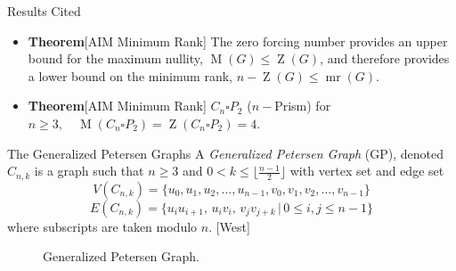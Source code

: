 \documentclass[final]{beamer}
\def\red{\color{red}}
\newcommand{\mr}{\operatorname{mr}}
\newcommand{\M}{\operatorname{M}}
\newcommand{\Z}{\operatorname{Z}}
\newcommand{\bit}{\begin{itemize}}
\newcommand{\eit}{\end{itemize}}
\begin{document}
\begin{frame}{}
\begin{columns}[t]
\begin{column}{0.38\linewidth}
\begin{block}{Results Cited}
\bit

\item {\bf Theorem}[AIM Minimum Rank]
The zero forcing number provides an upper bound for the maximum nullity, $\M(G) \leq \Z(G)$, and therefore provides a lower bound on the minimum rank, $n-\Z(G) \leq \mr(G)$. 
\item {\bf Theorem}[AIM Minimum Rank]
$C_n \square P_2$ ($n-$Prism) for $n \geq 3, \quad\M(C_n \square P_2) = \Z(C_n \square P_2) = 4.$
\eit
\end{block}

\begin{block}{\red\Huge The Generalized Petersen Graphs}
A {\color{blue}\emph{Generalized Petersen Graph}} (GP), denoted $C_{n,k}$
is a graph such that 
$n \geq 3$ and $0 < k \leq \lfloor \frac{n-1}{2} \rfloor$
with vertex set and edge set
\[
V(C_{n,k}) = \{u_0, u_1, u_2, \ldots, u_{n-1}, v_0, v_1,
v_2, \ldots,
v_{n-1} \}
\] 
\[
E(C_{n,k}) = \{u_iu_{i+1},\, u_iv_i,\, v_jv_{j+k} \, |\, 0 \leq
i,j
\leq n-1\}
\] where subscripts are taken modulo $n$. [West]
\begin{figure}[h!] 
\centering
{}
\caption{Generalized Petersen Graph.}
\end{figure}


\end{block}


\end{column}
\end{columns}
\end{frame}
\end{document}
